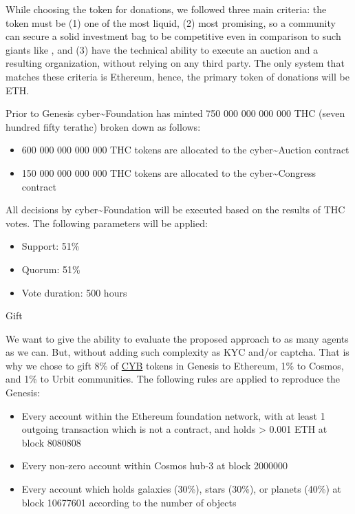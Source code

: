 \documentclass[8pt,oneside]{amsart}
\makeatletter
\newcommand{\linkred}[2]{\href{#1}{\color{red}{#2}}}
\renewcommand\subsection{\@startsection{subsection}
                                    {2}{\z@}
                                    {-3.25ex\@plus -1ex \@minus -.2ex}
                                    {0ex \@plus .2ex}
                                    {\play\Large}
                        }
\newcommand{\titleSection}[1]{\subsection{#1}}
\newenvironment{Figure}
  {\par\medskip\noindent\minipage{\linewidth}}
  {\endminipage\par\medskip}
\makeatother
\begin{document}
While choosing the token for donations, we followed three main criteria: the token must be (1) one of the most liquid, (2) most promising, so a community can secure a solid investment bag to be competitive even in comparison to such giants like \linkred{https://google.com}{Google}, and (3) have the technical ability to execute an auction and a resulting organization, without relying on any third party. The only system that matches these criteria is Ethereum, hence, the primary token of donations will be ETH.

Prior to Genesis cyber\~{}Foundation has minted 750 000 000 000 000 THC (seven hundred fifty terathc) broken down as follows:

\begin{itemize}
\item 600 000 000 000 000 THC tokens are allocated to the cyber\~{}Auction contract
\item 150 000 000 000 000 THC tokens are allocated to the cyber\~{}Congress contract

\end{itemize}

\begin{Figure}
 \centering
 
\end{Figure}

All decisions by cyber\~{}Foundation will be executed based on the results of THC votes. The following parameters will be applied:

\begin{itemize}
\item Support: 51\%
\item Quorum: 51\%
\item Vote duration: 500 hours
\end{itemize}

\titleSection{Gift}\label{gift}

We want to give the ability to evaluate the proposed approach to as many agents as we can. But, without adding such complexity as KYC and/or captcha. That is why we chose to gift 8\% of {\hyperref[cyb]{CYB}} tokens in Genesis to Ethereum, 1\% to Cosmos, and 1\% to Urbit communities. The following rules are applied to reproduce the Genesis:
\begin{itemize}
 \item Every account within the Ethereum foundation network, with at least 1 outgoing transaction which is not a contract, and holds > 0.001 ETH at block 8080808
 \item Every non-zero account within Cosmos hub-3 at block 2000000
 \item Every account which holds galaxies (30\%), stars (30\%), or planets (40\%) at block 10677601 according to the number of objects
\end{itemize}
\end{document}
